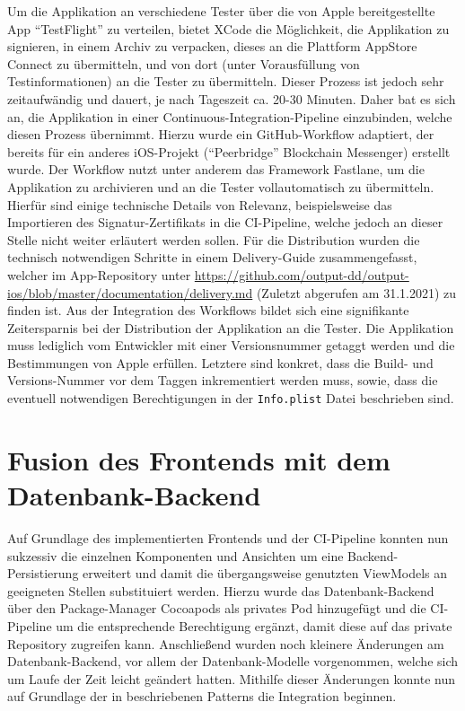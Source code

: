 Um die Applikation an verschiedene Tester über die von Apple bereitgestellte App \enquote{TestFlight} zu verteilen, bietet XCode die Möglichkeit, die Applikation zu signieren, in einem Archiv zu verpacken, dieses an die Plattform AppStore Connect zu übermitteln, und von dort (unter Vorausfüllung von Testinformationen) an die Tester zu übermitteln. Dieser Prozess ist jedoch sehr zeitaufwändig und dauert, je nach Tageszeit ca. 20-30 Minuten. Daher bat es sich an, die Applikation in einer Continuous-Integration-Pipeline einzubinden, welche diesen Prozess übernimmt. Hierzu wurde ein GitHub-Workflow adaptiert, der bereits für ein anderes iOS-Projekt (\enquote{Peerbridge} Blockchain Messenger) erstellt wurde. Der Workflow nutzt unter anderem das Framework Fastlane, um die Applikation zu archivieren und an die Tester vollautomatisch zu übermitteln. Hierfür sind einige technische Details von Relevanz, beispielsweise das Importieren des Signatur-Zertifikats in die CI-Pipeline, welche jedoch an dieser Stelle nicht weiter erläutert werden sollen. Für die Distribution wurden die technisch notwendigen Schritte in einem Delivery-Guide zusammengefasst, welcher im App-Repository unter \url{https://github.com/output-dd/output-ios/blob/master/documentation/delivery.md} (Zuletzt abgerufen am 31.1.2021) zu finden ist. Aus der Integration des Workflows bildet sich eine signifikante Zeitersparnis bei der Distribution der Applikation an die Tester. Die Applikation muss lediglich vom Entwickler mit einer Versionsnummer getaggt werden und die Bestimmungen von Apple erfüllen. Letztere sind konkret, dass die Build- und Versions-Nummer vor dem Taggen inkrementiert werden muss, sowie, dass die eventuell notwendigen Berechtigungen in der \texttt{Info.plist} Datei beschrieben sind.

\section{Fusion des Frontends mit dem Datenbank-Backend}

Auf Grundlage des implementierten Frontends und der CI-Pipeline konnten nun sukzessiv die einzelnen Komponenten und Ansichten um eine Backend-Persistierung erweitert und damit die übergangsweise genutzten ViewModels an geeigneten Stellen substituiert werden. Hierzu wurde das Datenbank-Backend über den Package-Manager Cocoapods als privates Pod hinzugefügt und die CI-Pipeline um die entsprechende Berechtigung ergänzt, damit diese auf das private Repository zugreifen kann. Anschließend wurden noch kleinere Änderungen am Datenbank-Backend, vor allem der Datenbank-Modelle vorgenommen, welche sich um Laufe der Zeit leicht geändert hatten. Mithilfe dieser Änderungen konnte nun auf Grundlage der in  beschriebenen Patterns die Integration beginnen. \\


